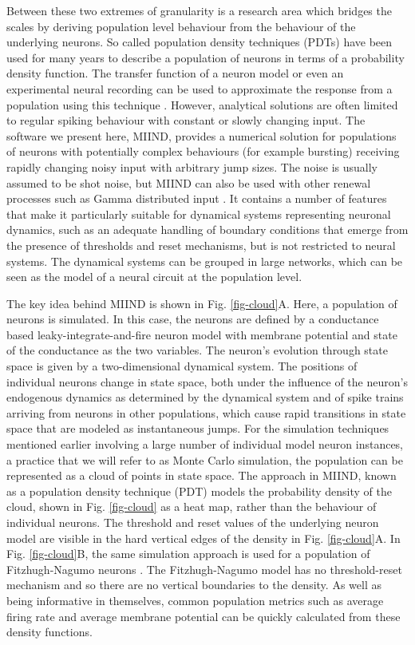 \documentclass[utf8]{frontiersSCNS} %
\begin{document}
Between these two extremes of granularity is a research area which bridges the scales by deriving population level behaviour from the behaviour of the underlying neurons. So called population density techniques (PDTs) have been used for many years \citep{knight1972dynamics,knight1996dynamical,omurtag2000} to describe a population of neurons in terms of a probability density function. The transfer function of a neuron model or even an experimental neural recording can be used to approximate the response from a population using this technique \citep{wilson1972excitatory,el2009master,carlu2020mean}. However, analytical solutions are often limited to regular spiking behaviour with constant or slowly changing input. The software we present here, MIIND, provides a numerical solution for populations of neurons with potentially complex behaviours (for example bursting) receiving rapidly changing noisy input with arbitrary jump sizes. The noise is usually assumed to be shot noise, but MIIND can also be used with other renewal processes such as Gamma distributed input \citep{lai2017population}. 
It contains a number of features that make it particularly suitable for dynamical systems representing neuronal dynamics, such as an adequate handling of boundary conditions that emerge from the presence of thresholds and reset mechanisms, but is not restricted to neural systems. The dynamical systems can be grouped in large networks, which can be seen as the model of a neural circuit at the population level.

The key idea behind MIIND is shown in Fig. \ref{fig-cloud}A. Here, a population of neurons is simulated. In this case, the neurons are defined by a conductance based leaky-integrate-and-fire neuron model with membrane potential and state of the conductance as the two variables. The neuron's evolution through state space is given by a two-dimensional dynamical system. The positions of individual neurons change in state space, both under the influence of the neuron's endogenous dynamics as determined by the dynamical system and of spike trains arriving from neurons in other populations, which cause rapid transitions in state space that are modeled as instantaneous jumps. For the simulation techniques mentioned earlier involving a large number of individual model neuron instances, a practice that we will refer to as Monte Carlo simulation, the population can be represented as a cloud of points in state space. The approach in MIIND, known as a population density technique (PDT) models the probability density of the cloud, shown in Fig. \ref{fig-cloud} as a heat map, rather than the behaviour of individual neurons. The threshold and reset values of the underlying neuron model are visible in the hard vertical edges of the density in Fig. \ref{fig-cloud}A. In Fig. \ref{fig-cloud}B, the same simulation approach is used for a population of Fitzhugh-Nagumo neurons \citep{fitzhugh1961impulses,nagumo1962active}. The Fitzhugh-Nagumo model has no threshold-reset mechanism and so there are no vertical boundaries to the density. As well as being informative in themselves, common population metrics such as average firing rate and average membrane potential can be quickly calculated from these density functions. 
\end{document}
